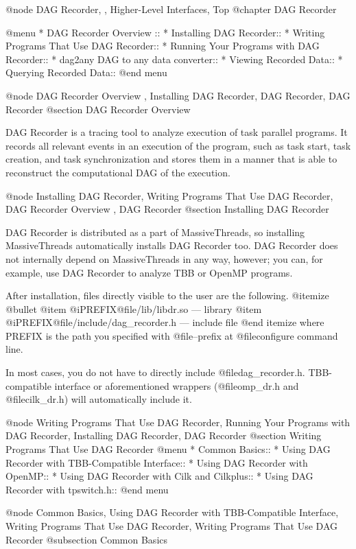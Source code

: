 @node DAG Recorder,  , Higher-Level Interfaces, Top
@chapter DAG Recorder

@menu
* DAG Recorder Overview ::
* Installing DAG Recorder::
* Writing Programs That Use DAG Recorder::
* Running Your Programs with DAG Recorder::
* dag2any DAG to any data converter::
* Viewing Recorded Data::
* Querying Recorded Data::
@end menu

@node DAG Recorder Overview , Installing DAG Recorder, DAG Recorder, DAG Recorder
@section DAG Recorder Overview 

DAG Recorder is a tracing tool to analyze execution of task parallel
programs.  It records all relevant events in an execution of the
program, such as task start, task creation, and task synchronization and
stores them in a manner that is able to reconstruct the computational
DAG of the execution.

@node Installing DAG Recorder, Writing Programs That Use DAG Recorder, DAG Recorder Overview , DAG Recorder
@section Installing DAG Recorder

DAG Recorder is distributed as a part of MassiveThreads, so installing
MassiveThreads automatically installs DAG Recorder too.  DAG Recorder
does not internally depend on MassiveThreads in any way, however; you
can, for example, use DAG Recorder to analyze TBB or OpenMP programs.  

After installation, files directly visible to the user are the following.
@itemize @bullet
@item @i{PREFIX}@file{/lib/libdr.so} --- library
@item @i{PREFIX}@file{/include/dag_recorder.h} --- include file
@end itemize
where PREFIX is the path you specified with @file{--prefix} at
@file{configure} command line.  

In most cases, you do not have to directly include
@file{dag_recorder.h}.  TBB-compatible interface or aforementioned
wrappers (@file{omp_dr.h} and @file{cilk_dr.h}) will automatically
include it.

@node Writing Programs That Use DAG Recorder, Running Your Programs with DAG Recorder, Installing DAG Recorder, DAG Recorder
@section Writing Programs That Use DAG Recorder
@menu
* Common Basics::
* Using DAG Recorder with TBB-Compatible Interface::
* Using DAG Recorder with OpenMP::
* Using DAG Recorder with Cilk and Cilkplus::
* Using DAG Recorder with tpswitch.h::
@end menu

@node Common Basics, Using DAG Recorder with TBB-Compatible Interface, Writing Programs That Use DAG Recorder, Writing Programs That Use DAG Recorder
@subsection Common Basics

